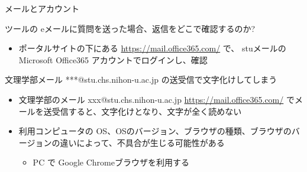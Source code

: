 \documentclass[a4j,10pt]{jsarticle}
\def\lthtmlcheckvsize{\ifdim\ht\sizebox<\vsize 
  \ifdim\wd\sizebox<\hsize\expandafter\hfill\fi \expandafter\vfill
  \else\expandafter\vss\fi}%
\begin{document}
{\begin{frame}[label={sec:org4aad05a},fragile]{メールとアカウント}
\begin{block}{ツールの eメールに質問を送った場合、返信をどこで確認するのか?}
\begin{itemize}
\item ポータルサイトの下にある
\url{https://mail.office365.com/}
で、 stuメールの Microsoft Office365 アカウントでログインし、確認
\end{itemize}
\end{block}
\par
\begin{block}{文理学部メール ***@stu.chs.nihon-u.ac.jp の送受信で文字化けしてしまう}
\begin{itemize}
\item 文理学部のメール xxx@stu.chs.nihon-u.ac.jp \url{https://mail.office365.com/} でメールを送受信すると、文字化けとなり、文字が全く読めない
\par
\item 利用コンピュータの OS、OSのバージョン、ブラウザの種類、ブラウザのバージョンの違いによって、不具合が生じる可能性がある
\begin{itemize}
\item PC で Google Chromeブラウザを利用する
\end{itemize}
\end{itemize}
\end{block}
\end{frame}%
\lthtmlfigureZ
\lthtmlcheckvsize\clearpage}
\end{document}
